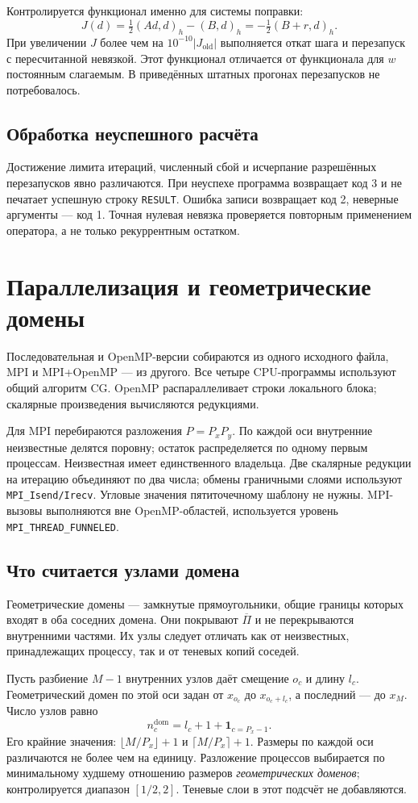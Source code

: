 \documentclass[11pt,a4paper]{article}
\begin{document}
Контролируется функционал именно для системы поправки:
\[
J(d)=\tfrac12(Ad,d)_h-(B,d)_h
=-\tfrac12(B+r,d)_h.
\]
При увеличении $J$ более чем на $10^{-10}|J_{\mathrm{old}}|$ выполняется
откат шага и перезапуск с пересчитанной невязкой. Этот функционал
отличается от функционала для $w$ постоянным слагаемым. В приведённых
штатных прогонах перезапусков не потребовалось.

\subsection*{Обработка неуспешного расчёта}
Достижение лимита итераций, численный сбой и исчерпание разрешённых
перезапусков явно различаются. При неуспехе программа возвращает код 3
и не печатает успешную строку \texttt{RESULT}. Ошибка записи возвращает
код 2, неверные аргументы --- код 1. Точная нулевая невязка проверяется
повторным применением оператора, а не только рекуррентным остатком.

\clearpage
\section{Параллелизация и геометрические домены}
Последовательная и OpenMP-версии собираются из одного исходного файла,
MPI и MPI+OpenMP --- из другого. Все четыре CPU-программы используют
общий алгоритм CG. OpenMP распараллеливает строки локального блока;
скалярные произведения вычисляются редукциями.

Для MPI перебираются разложения $P=P_xP_y$. По каждой оси внутренние
неизвестные делятся поровну; остаток распределяется по одному первым
процессам. Неизвестная имеет единственного владельца. Две скалярные
редукции на итерацию объединяют по два числа; обмены граничными слоями
используют \texttt{MPI\_Isend/Irecv}. Угловые значения пятиточечному
шаблону не нужны. MPI-вызовы выполняются вне OpenMP-областей,
используется уровень \texttt{MPI\_THREAD\_FUNNELED}.

\subsection*{Что считается узлами домена}
Геометрические домены --- замкнутые прямоугольники, общие границы которых
входят в оба соседних домена. Они покрывают $\overline\Pi$ и не
перекрываются внутренними частями. Их узлы следует отличать как от
неизвестных, принадлежащих процессу, так и от теневых копий соседей.

Пусть разбиение $M-1$ внутренних узлов даёт смещение $o_c$ и длину $l_c$.
Геометрический домен по этой оси задан от $x_{o_c}$ до $x_{o_c+l_c}$,
а последний --- до $x_M$. Число узлов равно
\[
n_c^{\mathrm{dom}}=l_c+1+\boldsymbol1_{c=P_x-1}.
\]
Его крайние значения: $\lfloor M/P_x\rfloor+1$ и
$\lceil M/P_x\rceil+1$. Размеры по каждой оси различаются не более чем
на единицу. Разложение процессов выбирается по минимальному худшему
отношению размеров \emph{геометрических доменов}; контролируется
диапазон $[1/2,2]$. Теневые слои в этот подсчёт не добавляются.
\end{document}
